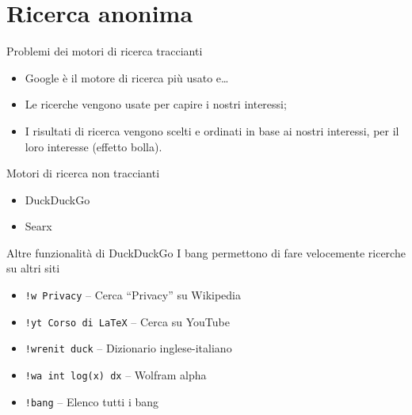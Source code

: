 
\section{Ricerca anonima}

\begin{myframe}{Problemi dei motori di ricerca traccianti}
  \begin{itemize}[<+->]
    \item Google è il motore di ricerca più usato e\dots{}
    \item Le ricerche vengono usate per capire i nostri interessi;
    \item I risultati di ricerca vengono scelti e ordinati in base ai nostri interessi, per il loro interesse (effetto bolla).
  \end{itemize}
\end{myframe}

\begin{myframe}{Motori di ricerca non traccianti}
  \begin{itemize}
    \item DuckDuckGo
    \item Searx
  \end{itemize}
\end{myframe}

\begin{myframe}{Altre funzionalità di DuckDuckGo}
  I bang permettono di fare velocemente ricerche su altri siti
  \begin{itemize}[<+->]
    \item \texttt{!w Privacy} -- Cerca ``Privacy'' su Wikipedia
    \item \texttt{!yt Corso di LaTeX} -- Cerca su YouTube
    \item \texttt{!wrenit duck} -- Dizionario inglese-italiano
    \item \texttt{!wa int log(x) dx} -- Wolfram alpha
    \item \texttt{!bang} -- Elenco tutti i bang
  \end{itemize}
\end{myframe}


